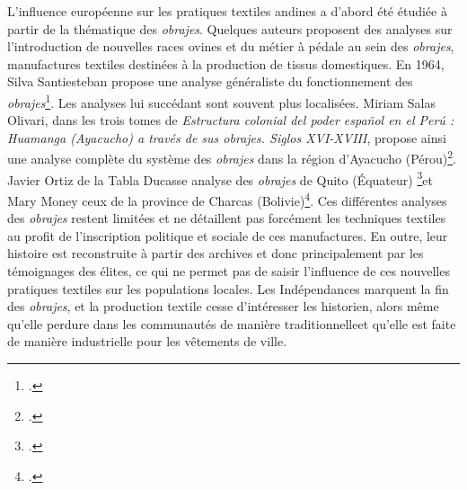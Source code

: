L'influence européenne sur les pratiques textiles andines a d'abord été étudiée à partir de la thématique des \textit{obrajes}. Quelques auteurs proposent des analyses sur l'introduction de nouvelles races ovines et du métier à pédale au sein des \textit{obrajes}, manufactures textiles destinées à la production de tissus domestiques. En 1964, Silva Santiesteban propose une analyse généraliste du fonctionnement des \textit{obrajes}\footcite{silvasantistebanObrajesVirreinatoPeru1964}. Les analyses lui succédant sont souvent plus localisées. Miriam Salas Olivari, dans les trois tomes de \textit{Estructura colonial del poder español en el Perú : Huamanga (Ayacucho) a través de sus obrajes. Siglos XVI-XVIII}, propose ainsi une analyse complète du système des \textit{obrajes} dans la région d'Ayacucho (Pérou)\footcite{salasolivariEstructuraColonialPoder1998}. Javier Ortiz de la Tabla Ducasse analyse des \textit{obrajes} de Quito (Équateur) \footcite{ortizdelatabladucasseObrajesObrajerosQuito1982}et Mary Money ceux de la province de Charcas (Bolivie)\footcite{moneyObrajesTrajeComercio1983}. Ces différentes analyses des \textit{obrajes} restent limitées et ne détaillent pas forcément les techniques textiles au profit de l'inscription politique et sociale de ces manufactures. En outre, leur histoire est reconstruite à partir des archives et donc principalement par les témoignages des élites, ce qui ne permet pas de saisir l'influence de ces nouvelles pratiques textiles sur les populations locales. Les Indépendances marquent la fin des \textit{obrajes}, et la production textile cesse d'intéresser les historien, alors même qu'elle perdure dans les communautés de manière \og traditionnelle\fg \:et qu'elle est faite de manière industrielle pour les vêtements de ville. 

